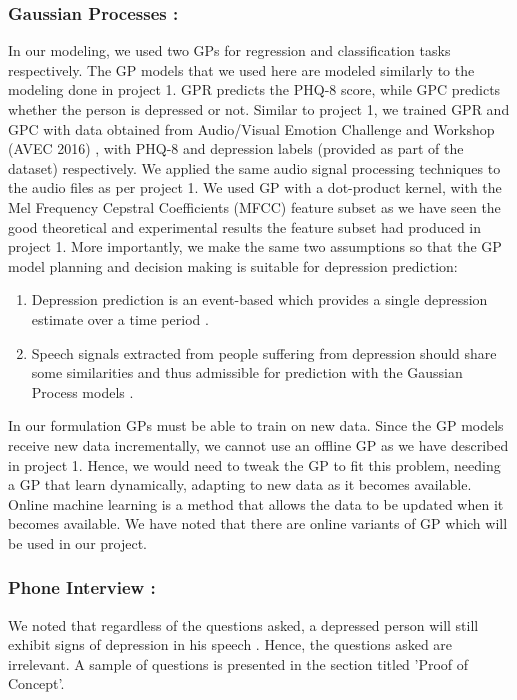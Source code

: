 \documentclass{article}
\begin{document}
	\subsubsection{Gaussian Processes :}
	In our modeling, we used two GPs for regression and classification tasks respectively. 
    The GP models that we used here are modeled similarly to the modeling done in project 1. 
    GPR predicts the PHQ-8 score, while GPC predicts whether the person is depressed or not. 
    Similar to project 1, we trained GPR and GPC with data obtained from Audio/Visual Emotion Challenge and Workshop (AVEC 2016) \cite{avec2016}, with PHQ-8 and depression labels (provided as part of the dataset) respectively. 
    We applied the same audio signal processing techniques to the audio files as per project 1. 
    We used GP with a dot-product kernel, with the Mel Frequency Cepstral Coefficients (MFCC) feature subset as we have seen the good theoretical and experimental results the feature subset had produced in project 1. 
    More importantly, we make the same two assumptions so that the GP model planning and decision making is suitable for depression prediction:
	\begin{enumerate}
		\item Depression prediction is an event-based which provides a single depression estimate over a time period \cite{Valstar2016}.
		\item Speech signals extracted from people suffering from depression should share some similarities and thus admissible for prediction with the Gaussian Process models \cite{Cummins2015}.
	\end{enumerate}
In our formulation GPs must be able to train on new data. 
    Since the GP models receive new data incrementally, we cannot use an offline GP as we have described in project 1. 
    Hence, we would need to tweak the GP to fit this problem, needing a GP that learn dynamically, adapting to new data as it becomes available. 
    Online machine learning is a method that allows the data to be updated when it becomes available. 
    We have noted that there are online variants of GP which will be used in our project.
	
	\subsubsection{Phone Interview :}
We noted that regardless of the questions asked, a depressed person will still exhibit signs of depression in his speech \cite{jad2008}. 
    Hence, the questions asked are irrelevant. 
    A sample of questions is presented in the section titled 'Proof of Concept'.
\end{document}
